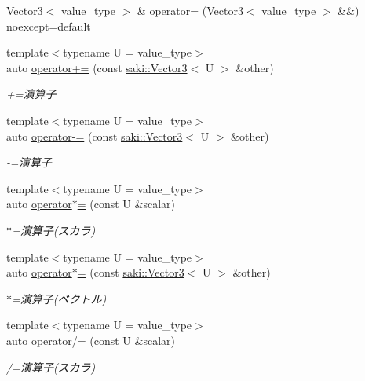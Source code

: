 \begin{DoxyCompactItemize}
\item 
\mbox{\hyperlink{classsaki_1_1_vector3}{Vector3}}$<$ value\+\_\+type $>$ \& \mbox{\hyperlink{classsaki_1_1_vector3_a714922994d6fa229fa4a44a322fd20a6}{operator=}} (\mbox{\hyperlink{classsaki_1_1_vector3}{Vector3}}$<$ value\+\_\+type $>$ \&\&) noexcept=default
\item 
{\footnotesize template$<$typename U  = value\+\_\+type$>$ }\\auto \mbox{\hyperlink{classsaki_1_1_vector3_a4ea98424be42bb8a20d8d240d25c948d}{operator+=}} (const \mbox{\hyperlink{classsaki_1_1_vector3}{saki\+::\+Vector3}}$<$ U $>$ \&other)
\begin{DoxyCompactList}\small\item\em +=演算子 \end{DoxyCompactList}\item 
{\footnotesize template$<$typename U  = value\+\_\+type$>$ }\\auto \mbox{\hyperlink{classsaki_1_1_vector3_a9ffa8f65834570566ab89d2e1b511f52}{operator-\/=}} (const \mbox{\hyperlink{classsaki_1_1_vector3}{saki\+::\+Vector3}}$<$ U $>$ \&other)
\begin{DoxyCompactList}\small\item\em -\/=演算子 \end{DoxyCompactList}\item 
{\footnotesize template$<$typename U  = value\+\_\+type$>$ }\\auto \mbox{\hyperlink{classsaki_1_1_vector3_abcfc63ddcaa8c7f148debedbe7fca788}{operator$\ast$=}} (const U \&scalar)
\begin{DoxyCompactList}\small\item\em $\ast$=演算子(スカラ) \end{DoxyCompactList}\item 
{\footnotesize template$<$typename U  = value\+\_\+type$>$ }\\auto \mbox{\hyperlink{classsaki_1_1_vector3_a69ebc6f000a2d0d9b15007f371d1385b}{operator$\ast$=}} (const \mbox{\hyperlink{classsaki_1_1_vector3}{saki\+::\+Vector3}}$<$ U $>$ \&other)
\begin{DoxyCompactList}\small\item\em $\ast$=演算子(ベクトル) \end{DoxyCompactList}\item 
{\footnotesize template$<$typename U  = value\+\_\+type$>$ }\\auto \mbox{\hyperlink{classsaki_1_1_vector3_aacf8494aa9c503f70bad8039e1f926b9}{operator/=}} (const U \&scalar)
\begin{DoxyCompactList}\small\item\em /=演算子(スカラ) \end{DoxyCompactList}\item 

\end{DoxyCompactItemize}
